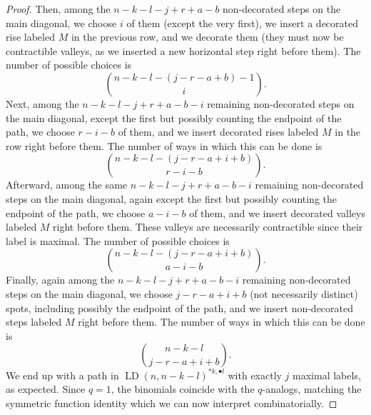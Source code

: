 \documentclass[reqno]{amsart}
\theoremstyle{plain}
\theoremstyle{definition}
\theoremstyle{remark}
\DeclareMathOperator{\LD}{LD}
\newcommand{\<}{\langle}
\renewcommand{\>}{\rangle}
\begin{document}
\begin{proof}
    Then, among the $n-k-l-j+r+a-b$ non-decorated steps on the main diagonal, we choose $i$ of them (except the very first), we insert a decorated rise labeled $M$ in the previous row, and we decorate them (they must now be contractible valleys, as we inserted a new horizontal step right before them). The number of possible choices is \[ \binom{n-k-l-(j-r-a+b)-1}{i}. \]
    Next, among the $n-k-l-j+r+a-b-i$ remaining non-decorated steps on the main diagonal, except the first but possibly counting the endpoint of the path, we choose $r-i-b$ of them, and we insert decorated rises labeled $M$ in the row right before them. The number of ways in which this can be done is \[ \binom{n-k-l-(j-r-a+i+b)}{r-i-b}. \]
    Afterward, among the same $n-k-l-j+r+a-b-i$ remaining non-decorated steps on the main diagonal, again except the first but possibly counting the endpoint of the path, we choose $a-i-b$ of them, and we insert decorated valleys labeled $M$ right before them. These valleys are necessarily contractible since their label is maximal. The number of possible choices is \[ \binom{n-k-l-(j-r-a+i+b)}{a-i-b}. \]
    Finally, again among the $n-k-l-j+r+a-b-i$ remaining non-decorated steps on the main diagonal, we choose $j-r-a+i+b$ (not necessarily distinct) spots, including possibly the endpoint of the path, and we insert non-decorated steps labeled $M$ right before them. The number of ways in which this can be done is \[ \binom{n-k-l}{j-r-a+i+b}. \]
    We end up with a path in $\LD(n,n-k-l)^{\ast k, \bullet l}$ with exactly $j$ maximal labels, as expected. Since $q=1$, the binomials coincide with the $q$-analogs, matching the symmetric function identity which we can now interpret combinatorially.
\end{proof}
\end{document}
